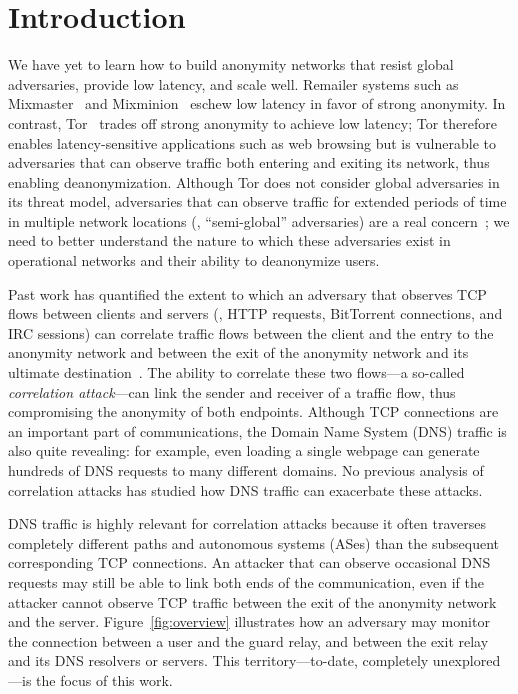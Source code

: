 \section{Introduction}
\label{sec:introduction}

We have yet to learn how to build anonymity networks that
resist global adversaries, provide low latency, and scale well.  Remailer
systems such as Mixmaster~\cite{mixmaster} and
Mixminion~\cite{Danezis2003a} eschew low latency in favor of
strong anonymity.
In contrast, Tor~\cite{dingledine2004a} trades off strong anonymity to
achieve low latency; Tor therefore
enables latency-sensitive applications such as web browsing but is
vulnerable to
adversaries that can observe traffic both
entering and exiting its network, thus enabling deanonymization.
Although Tor does not consider global adversaries in its threat model,
adversaries that can observe traffic for extended periods of time in
multiple network locations (\ie, ``semi-global'' adversaries) are a real
concern~\cite{Farrell2014a,Johnson2013a}; we need to better understand
the nature to which these adversaries exist in operational networks and
their ability to deanonymize users.

Past work has quantified the extent to which an adversary that
observes TCP flows between clients and servers (\eg, HTTP requests,
BitTorrent connections, and IRC sessions) can correlate traffic flows
between the client and the entry to the anonymity network and between
the exit of the anonymity network and its ultimate
destination~\cite{Johnson2013a,Murdoch2007a}. The ability to correlate
these two flows---a so-called {\em correlation attack}---can link the
sender and receiver of a traffic flow, thus compromising the anonymity
of both endpoints. Although TCP connections are an important part
of communications, the Domain Name System (DNS) traffic is also
quite revealing: for example, even loading a single webpage can generate
hundreds of DNS requests to many different domains. No previous analysis
of correlation attacks has studied how DNS traffic can exacerbate
these attacks.

DNS traffic is highly relevant for correlation attacks because it
often traverses completely different paths
and autonomous systems (ASes) than the subsequent corresponding TCP
connections.  An attacker that can observe occasional DNS
requests may still be able to link both ends of the communication, even
if the attacker cannot observe TCP traffic between the exit of the
anonymity network and the server.
Figure~\ref{fig:overview} illustrates how an adversary may
monitor the connection between a user and the guard relay, and between the exit
relay and its DNS resolvers or servers.  This
territory---to-date, completely unexplored---is the focus of this work.

